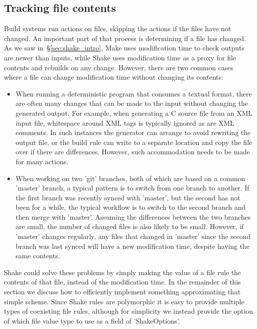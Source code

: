 \subsection{Tracking file contents\label{sec:file-contents}}

Build systems run actions on files, skipping the actions if the files have not
changed. An important part of that process is determining if a file has
changed. As we saw in~\S\ref{sec:shake_intro}, Make uses modification time to
check outputs are newer than inputs, while Shake uses modification time as a
proxy for file contents and rebuilds on any change. However, there are two
common cases where a file can change modification time without changing its
contents:

\begin{itemize}
\item When running a deterministic program that consumes a textual format, there
are often many changes that can be made to the input without changing the
generated output. For example, when generating a C source file from an XML input
file, whitespace around XML tags is typically ignored as are XML comments. In
such instances the generator can arrange to avoid rewriting the output file, or
the build rule can write to a separate location and copy the file over if there
are differences. However, such accommodation needs to be made for many actions.
\item When working on two \lst'git' branches, both of which are based on a
common \lst'master' branch, a typical pattern is to switch from one branch to
another. If the first branch was recently synced with \lst'master', but the
second has not been for a while, the typical workflow is to switch to the second
branch and then merge with \lst'master'. Assuming the differences between the
two branches are small, the number of changed files is also likely to be small.
However, if \lst'master' changes regularly, any files that changed in
\lst'master' since the second branch was last synced will have a new
modification time, despite having the same contents.
\end{itemize}

Shake could solve these problems by simply making the value of a file rule the
contents of that file, instead of the modification time. In the remainder of
this section we discuss how to efficiently implement something approximating
that simple scheme. Since Shake rules are polymorphic it is easy to provide
multiple types of coexisting file rules, although for simplicity we instead
provide the option of which file value type to use as a field of
\lst'ShakeOptions'.

